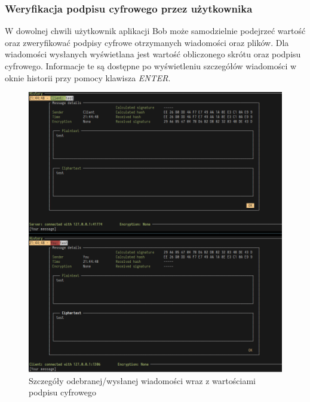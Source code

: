 \documentclass{article}
\begin{document}
      \subsubsection{Weryfikacja podpisu cyfrowego przez użytkownika}
        W dowolnej chwili użytkownik aplikacji Bob może samodzielnie podejrzeć wartość oraz zweryfikować podpisy cyfrowe
        otrzymanych wiadomości oraz plików. Dla wiadomości wysłanych wyświetlana jest wartość obliczonego skrótu oraz
        podpisu cyfrowego. Informacje te są dostępne po wyświetleniu szczegółów wiadomości w oknie historii przy pomocy
        klawisza \emph{ENTER}.

        \begin{figure}[tp]
            \centering
            \includegraphics[scale=0.5]{szczegoly_wiadomosci_z_podpisem}
            \caption{Szczegóły odebranej/wysłanej wiadomości wraz z wartościami podpisu cyfrowego}
            \label{DIGITAL_SIGNATURE}
        \end{figure}
\end{document}
